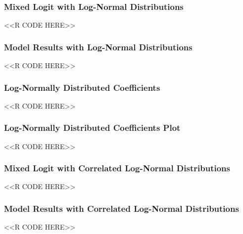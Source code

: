 \documentclass{beamer}
\begin{document}
\begin{frame}[fragile]\frametitle{Mixed Logit with Log-Normal Distributions}
    <<R CODE HERE>>
\end{frame}

\begin{frame}[fragile]\frametitle{Model Results with Log-Normal Distributions}
    \vspace{1ex}
    <<R CODE HERE>>
\end{frame}

\begin{frame}[fragile]\frametitle{Log-Normally Distributed Coefficients}
    <<R CODE HERE>>
\end{frame}

\begin{frame}[fragile]\frametitle{Log-Normally Distributed Coefficients Plot}
    <<R CODE HERE>>
\end{frame}

\begin{frame}[fragile]\frametitle{Mixed Logit with Correlated Log-Normal Distributions}
    <<R CODE HERE>>
\end{frame}

\begin{frame}[fragile]\frametitle{Model Results with Correlated Log-Normal Distributions}
    \vspace{1ex}
    <<R CODE HERE>>
\end{frame}
\end{document}
